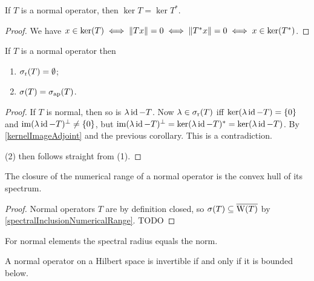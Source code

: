 \begin{corollary} \label{equalityKernelAdjointNormal}
If $T$ is a normal operator, then $\ker T = \ker T^*$.
\end{corollary}
\begin{proof}
We have $x\in\ker(T) \iff \lVert Tx\rVert = 0 \iff \lVert T^*x\rVert = 0 \iff x\in\ker(T^*)$. 
\end{proof}
\begin{corollary}
If $T$ is a normal operator then
\begin{enumerate}
\item $\sigma_\text{r}(T) = \emptyset$;
\item $\sigma(T) = \sigma_\text{ap}(T)$.
\end{enumerate} 
\end{corollary}
\begin{proof}
If $T$ is normal, then so is $\lambda\operatorname{id}-T$. Now $\lambda\in\sigma_\text{r}(T)$ iff $\ker(\lambda\operatorname{id} - T) = \{0\}$ and $\operatorname{im}(\lambda\operatorname{id}-T)^\perp \neq \{0\}$, but $\operatorname{im}(\lambda\operatorname{id}-T)^\perp = \ker(\lambda\operatorname{id}-T)^* = \ker(\lambda\operatorname{id}-T)$. By \ref{kernelImageAdjoint} and the previous corollary. This is a contradiction.

(2) then follows straight from (1).
\end{proof}

\begin{theorem} \label{closureNumericRangeConvexHullSpectrum}
The closure of the numerical range of a normal operator is the
convex hull of its spectrum.
\end{theorem}
\begin{proof}
Normal operators $T$ are by definition closed, so $\sigma(T)\subseteq \overline{\operatorname{W}(T)}$ by \ref{spectralInclusionNumericalRange}. TODO
\end{proof}

\begin{lemma} \label{normalSpectralRadiusEqualsNorm}
For normal elements the spectral radius equals the norm.
\end{lemma}

\begin{lemma}
A normal operator on a Hilbert space is invertible \textup{if and only if} it is bounded below.
\end{lemma}

